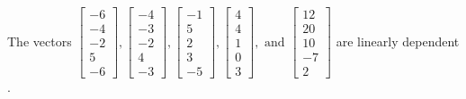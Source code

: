 \begin{exercise}
\begin{exerciseStatement}
  \end{exerciseStatement}
  \begin{exerciseAnswer}
   The vectors \(\left[\begin{array}{r}
-6 \\
-4 \\
-2 \\
5 \\
-6
\end{array}\right] , \left[\begin{array}{r}
-4 \\
-3 \\
-2 \\
4 \\
-3
\end{array}\right] , \left[\begin{array}{r}
-1 \\
5 \\
2 \\
3 \\
-5
\end{array}\right] , \left[\begin{array}{r}
4 \\
4 \\
1 \\
0 \\
3
\end{array}\right] , \text{ and } \left[\begin{array}{r}
12 \\
20 \\
10 \\
-7 \\
2
\end{array}\right]\) are 
  	 linearly dependent  .
  


  \end{exerciseAnswer}
\end{exercise}